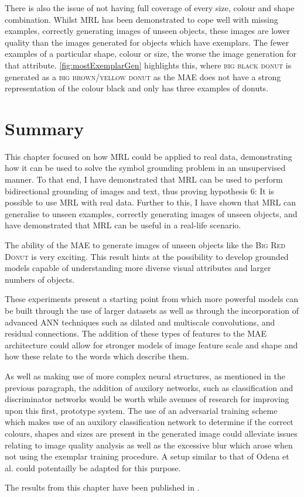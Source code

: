 There is also the issue of not having full coverage of every size, colour and shape combination. Whilst \ac{MRL} has been demonstrated to cope well with missing examples, correctly generating images of unseen objects, these images are lower quality than the images generated for objects which have exemplars. The fewer examples of a particular shape, colour or size, the worse the image generation for that attribute. \autoref{fig:mostExemplarGen} highlights this, where \textsc{big black donut} is generated as a \textsc{big brown/yellow donut} as the MAE does not have a strong representation of the colour black and only has three examples of donuts.



\section{Summary}
This chapter focused on how \ac{MRL} could be applied to real data, demonstrating how it can be used to solve the symbol grounding problem in an unsupervised manner.
To that end, I have demonstrated that \ac{MRL} can be used to perform bidirectional grounding of images and text, thus proving hypothesis 6: It is possible to use \ac{MRL} with real data. Further to this, I have shown that \ac{MRL} can generalise to unseen examples, correctly generating images of unseen objects, and have demonstrated that \ac{MRL} can be useful in a real-life scenario.

The ability of the \ac{MAE} to generate images of unseen objects like the \textsc{Big Red Donut} is very exciting. This result hints at the possibility to develop grounded models capable of understanding more diverse visual attributes and larger numbers of objects.

These experiments present a starting point from which more powerful models can be built through the use of larger datasets as well as through the incorporation of advanced  \ac{ANN} techniques such as dilated and multiscale convolutions, and residual connections. The addition of these types of features to the \ac{MAE} architecture could allow for stronger models of image feature scale and shape and how these relate to the words which describe them.

As well as making use of more complex neural structures, as mentioned in the previous paragraph, the addition of auxilory networks, such as classification and discriminator networks would be worth while avenues of research for improving upon this first, prototype system. The use of an adversarial training scheme which makes use of an auxilory classification network to determine if the correct colours, shapes and sizes are present in the generated image could alleviate issues relating to image quality analysis as well as the excessive blur which arose when not using the exemplar training procedure. A setup similar to that of Odena et al. \cite{odena2017conditional} could potentailly be adapted for this purpose.

The results from this chapter have been published in \cite{sheppard2020multimodal}.
